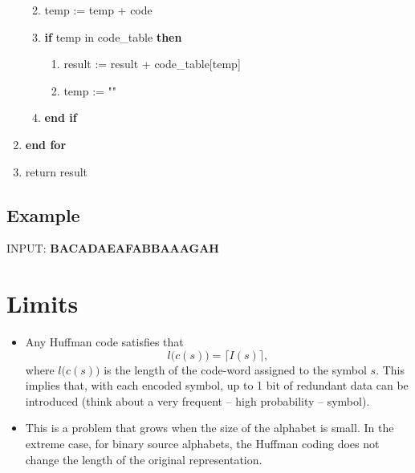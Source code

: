 \begin{enumerate}
  \begin{enumerate}
  \def\labelenumii{\arabic{enumii}.}
  \setcounter{enumii}{18}
  \tightlist
  \item
    temp := temp + code
  \item
    \textbf{if} temp in code\_table \textbf{then}

    \begin{enumerate}
    \def\labelenumiii{\arabic{enumiii}.}
    \setcounter{enumiii}{20}
    \tightlist
    \item
      result := result + code\_table{[}temp{]}
    \item
      temp := ""
    \end{enumerate}
  \item
    \textbf{end if}
  \end{enumerate}
\item
  \textbf{end for}
\item
  return result
\end{enumerate}

\subsection{Example}
INPUT: \textbf{BACADAEAFABBAAAGAH}

\section{Limits}
\begin{itemize}
\item
  Any Huffman code satisfies that \begin{equation}
    l\big(c(s)\big) = \lceil I(s)\rceil, \tag{Eq:Huffman}
  \end{equation} where \(l\big(c(s)\big)\) is the length of the
  code-word assigned to the symbol \(s\). This implies that, with each
  encoded symbol, up to 1 bit of redundant data can be introduced (think
  about a very frequent -- high probability -- symbol).
\item
  This is a problem that grows when the size of the alphabet is small.
  In the extreme case, for binary source alphabets, the Huffman coding
  does not change the length of the original representation.
\end{itemize}


